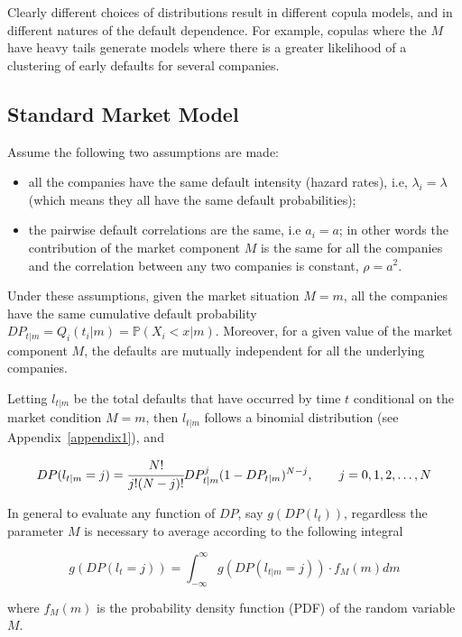 Clearly different choices of distributions result in different copula models, and in different natures of the default dependence. For example, copulas where the \(M\) have heavy tails generate models where there is a
greater likelihood of a clustering of early defaults for several
companies.

\subsection{Standard Market Model}\label{standard-market-model}

Assume the following two assumptions are made:

\begin{itemize}
	\tightlist
	\item
	all the companies have the same default intensity (hazard rates), i.e, \(\lambda_i = \lambda\) (which means they all have the same default probabilities);
	\item
	the pairwise default correlations are the same, i.e \(a_i = a\); in other words the contribution of the market
	component $M$ is the same for all the companies and the correlation between any two companies is constant, \(\rho = a^2\).
\end{itemize}

Under these assumptions, given the market situation \(M = m\), all the
companies have the same cumulative default probability
\(DP_{t|m}=Q_i(t_i|m)=\mathbb{P}(X_i < x|m)\). 
Moreover, for a given value of the
market component \(M\), the defaults are mutually independent for all
the underlying companies. 

Letting \(l_{t|m}\) be the total defaults that
have occurred by time \(t\) conditional on the market condition
\(M = m\), then \(l_{t|m}\) follows a binomial distribution (see Appendix~\ref{appendix1}), and

\[DP(l_{t|m} = j) = \cfrac{N!}{j!(N-j)!}DP^j_{t|m}(1-DP_{t|m})^{N-j},\qquad  j=0, 1, 2,\ldots,N\]

In general to evaluate any function of $DP$, say $g(DP(l_t))$, regardless the parameter $M$ is necessary to average according to the following integral

\begin{equation}
g(DP(l_{t} = j)) = \int_{-\infty}^{\infty}{g(DP(l_{t|m} = j))\cdot f_M(m)dm}
\label{eq:gaussian_quadrature}
\end{equation}

where $f_M(m)$ is the probability density function (PDF) of the random variable $M$.

